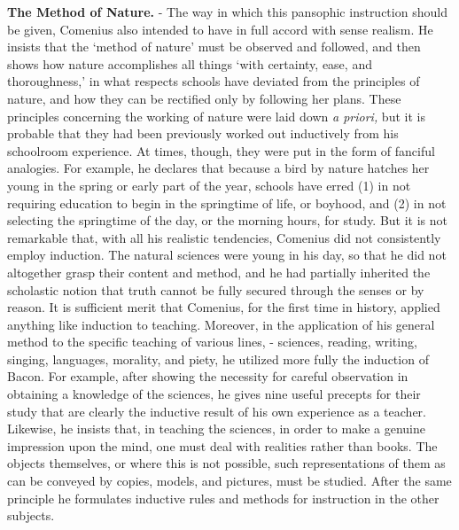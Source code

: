 \documentclass[]{book}
\begin{document}
\textbf{The Method of Nature.} - The way in which this pansophic instruction should be given, Comenius also intended to have in full accord with sense realism. He insists that the `method of nature' must be observed and followed, and then shows how nature accomplishes all things `with certainty, ease, and thoroughness,' in what respects schools have deviated from the principles of nature, and how they can be rectified only by following her plans. These principles concerning the working of nature were laid down \emph{a priori,} but it is probable that they had been previously worked out inductively from his schoolroom experience. At times, though, they were put in the form of fanciful analogies. For example, he declares that because a bird by nature hatches her young in the spring or early part of the year, schools have erred (1) in not requiring education to begin in the springtime of life, or boyhood, and (2) in not selecting the springtime of the day, or the morning hours, for study. But it is not remarkable that, with all his realistic tendencies, Comenius did not consistently employ induction. The natural sciences were young in his day, so that he did not altogether grasp their content and method, and he had partially inherited the scholastic notion that truth cannot be fully secured through the senses or by reason. It is sufficient merit that Comenius, for the first time in history, applied anything like induction to teaching. Moreover, in the application of his general method to the specific teaching of various lines, - sciences, reading, writing, singing, languages, morality, and piety, he utilized more fully the induction of Bacon. For example, after showing the necessity for careful observation in obtaining a knowledge of the sciences, he gives nine useful precepts for their study that are clearly the inductive result of his own experience as a teacher. Likewise, he insists that, in teaching the sciences, in order to make a genuine impression upon the mind, one must deal with realities rather than books. The objects themselves, or where this is not possible, such representations of them as can be conveyed by copies, models, and pictures, must be studied. After the same principle he formulates inductive rules and methods for instruction in the other subjects.
\end{document}
